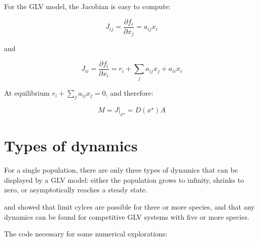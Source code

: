 \documentclass[]{book}
\begin{document}
For the GLV model, the Jacobian is easy to compute:

\[
J_{ij} = \frac{\partial f_i}{\partial x_j} = a_{ij} x_i
\]

and

\[
J_{ii} = \frac{\partial f_i}{\partial x_i} = r_i + \sum_j a_{ij} x_j + a_{ii} x_i
\]

At equilibrium \(r_i + \sum_j a_{ij} x_j = 0\), and therefore:

\[
M = \left. {J} \right|_{ {x}^\star} = D(x^\star)A
\]

\hypertarget{types-of-dynamics}{%
\section{Types of dynamics}\label{types-of-dynamics}}

For a single population, there are only three types of dynamics that can be displayed by a GLV model: either the population grows to infinity, shrinks to zero, or asymptotically reaches a steady state.

\citet{smale1976differential} and \citet{hirsch1982systems} showed that limit cylces are possible for three or more species, and that any dynamics can be found for competitive GLV systems with five or more species.

The code necessary for some numerical explorations:
\end{document}
